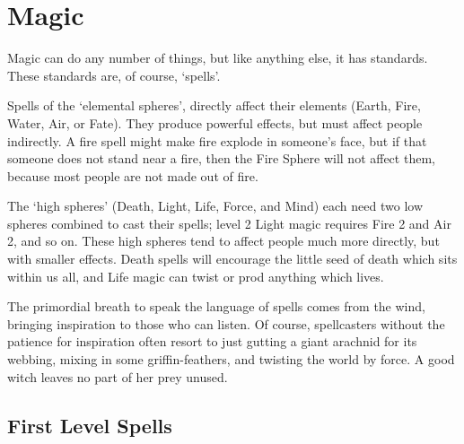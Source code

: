 \chapter[Chamber of Magic]{Magic}
\label{spellsChapter}
\toggletrue{examplecharacter}

\begin{multicols}{2}

\noindent
Magic can do any number of things, but like anything else, it has standards.
These standards are, of course, `spells'.

Spells of the `elemental spheres', directly affect their elements (Earth, Fire, Water, Air, or Fate).
They produce powerful effects, but must affect people indirectly.
A fire spell might make fire explode in someone's face, but if that someone does not stand near a fire, then the Fire Sphere will not affect them, because most people are not made out of fire.

The `high spheres' (Death, Light, Life, Force, and Mind) each need two low spheres combined to cast their spells; level 2 Light magic requires Fire 2 and Air 2, and so on.
These high spheres tend to affect people much more directly, but with smaller effects.
Death spells will encourage the little seed of death which sits within us all, and Life magic can twist or prod anything which lives.

The primordial breath to speak the language of spells comes from the wind, bringing inspiration to those who can listen.
Of course, spellcasters without the patience for inspiration often resort to just gutting a giant arachnid for its webbing, mixing in some griffin-feathers, and twisting the world by force.
A good witch leaves no part of her prey unused.



\end{multicols}

\section{First Level Spells}

